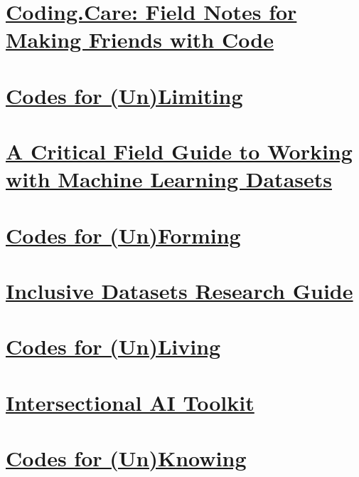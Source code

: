 \documentclass[11pt,oneside]{scrbook} %
\begin{document}
\chapter{\href{https://coding.care/guide.html}{Coding.Care: Field Notes for Making Friends with Code}}

\chapter{\href{https://coding.care/unlimiting.html}{Codes for (Un)Limiting}}

\chapter{\href{https://knowingmachines.org/critical-field-guide}{A Critical Field Guide to Working with Machine Learning Datasets}}

\chapter{\href{https://coding.care/unforming.html}{Codes for (Un)Forming}}

\chapter{\href{https://libguides.usc.edu/inclusive-datasets}{Inclusive Datasets Research Guide}}

\chapter{\href{https://coding.care/unliving.html}{Codes for (Un)Living}}

\chapter{\href{https://intersectionalai.com}{Intersectional AI Toolkit}}

\chapter{\href{https://coding.care/unknowing.html}{Codes for (Un)Knowing}}
\end{document}
